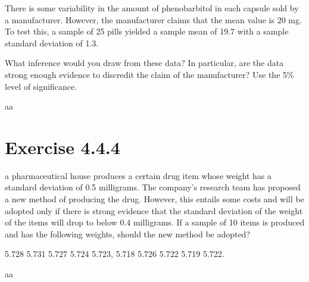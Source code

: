 \documentclass[titlepage, letterpaper, fleqn]{article}
\newcommand{\spacepls}{\vspace{5mm}}
\begin{document}
{\large There is some variability in the amount of phenobarbitol in each capsule sold by a manufacturer.
However, the manufacturer claims that the mean value is 20 mg.
To test this, a sample of 25 pills yielded a sample mean of 19.7 with a sample standard deviation of 1.3.

What inference would you draw from these data?
In particular, are the data strong enough evidence to discredit the claim of the manufacturer?
Use the 5\% level of significance.}

aa

\spacepls

\section{Exercise 4.4.4}

{\large a pharmaceutical house produces a certain drug item whose weight has a standard deviation of 0.5 milligrams.
The company's research team has proposed a new method of producing the drug.
However, this entails some costs and will be adopted only if there is strong evidence that the standard deviation of the weight of the items will drop to below 0.4 milligrams.
If a sample of 10 items is produced and has the following weights, should the new method be adopted?

5.728  5.731  5.727  5.724  5.723,
5.718  5.726  5.722  5.719  5.722.}

aa
\end{document}
